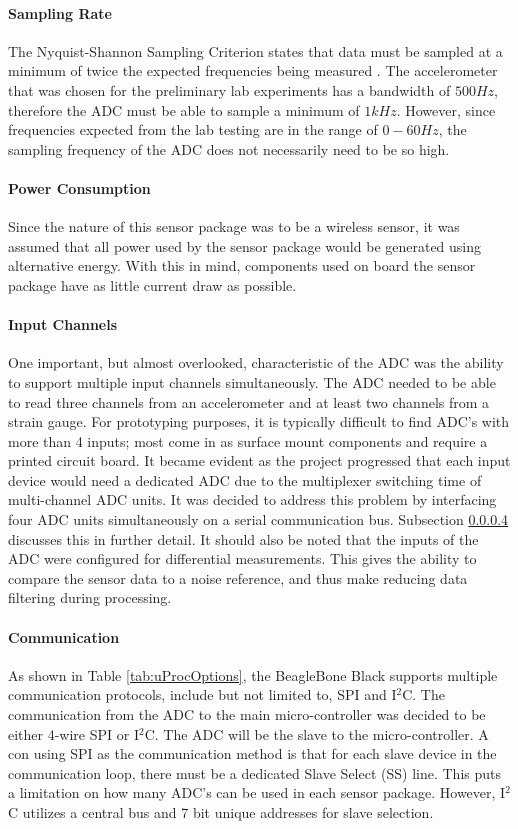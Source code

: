 \paragraph{Sampling Rate}		%
\label{sec:adc_fin}
\indent The Nyquist-Shannon Sampling Criterion states that data must be sampled at a minimum of twice the expected frequencies being measured
\cite{MusaJouaneh:2013}. The accelerometer that was chosen for the preliminary lab experiments has a bandwidth of $500 Hz$, therefore the ADC must be able
to sample a minimum of $1kHz$. However, since frequencies expected from the lab testing are in the range of $0-60Hz$, the sampling frequency of the ADC
does not necessarily need to be so high. %
%
\paragraph{Power Consumption}
\label{sec:adc_power_cons.}
\indent Since the nature of this sensor package was to be a wireless sensor, it was assumed that all power used by the sensor package would be generated
using alternative energy. With this in mind, components used on board the sensor package have as little current draw as possible.
%
\paragraph{Input Channels}
\label{sec:adc_in_ch_num}
\indent One important, but almost overlooked, characteristic of the ADC was the ability to support multiple input channels simultaneously. The ADC needed
to be able to read three channels from an accelerometer and at least two channels from a strain gauge. For prototyping purposes, it is typically difficult
to find ADC's with more than 4 inputs; most come in as surface mount components and require a printed circuit board. It became evident as the project progressed that each input device would need a dedicated ADC due to the multiplexer switching time of multi-channel ADC units. 
It was decided to address this problem by interfacing four ADC units simultaneously on a serial communication bus.
Subsection \ref{sec:adc_comm} discusses this in further detail.
It should also be noted that the inputs of the ADC were configured for differential measurements.
This gives the ability to compare the sensor data to a noise reference, and thus make reducing data filtering during processing. 
%
\paragraph{Communication}
\label{sec:adc_comm}
\indent As shown in Table \ref{tab:uProcOptions}, the BeagleBone Black supports multiple communication protocols, include but not limited to, SPI and
I$^{2}$C. The communication from the ADC to the main micro-controller was decided to be either  4-wire SPI or I$^{2}$C. The ADC will be the slave to the
micro-controller. A con using SPI as the communication method is that for each slave device in the communication loop, there must be a dedicated Slave
Select (SS) line. This puts a limitation on how many ADC's can be used in each sensor package. However, I$^{2}$C utilizes a central bus and 7 bit unique
addresses for slave selection.

